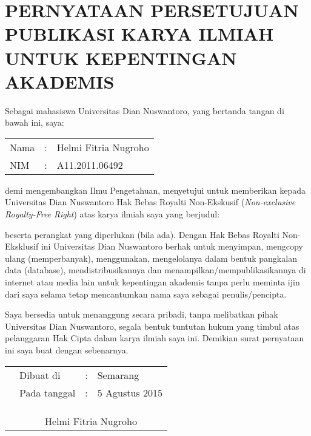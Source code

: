 \documentclass[laporan.tex]{subfiles}
\begin{document}
\chapter*{PERNYATAAN PERSETUJUAN PUBLIKASI KARYA ILMIAH UNTUK KEPENTINGAN AKADEMIS}

Sebagai mahasiswa Universitas Dian Nuswantoro, yang bertanda tangan di bawah ini, saya:

\begin{tabular}{l c l}
Nama & : & Helmi Fitria Nugroho \\
NIM & : & A11.2011.06492 \\
\end{tabular}

demi mengembangkan Ilmu Pengetahuan, menyetujui untuk memberikan kepada Universitas Dian Nuswantoro Hak Bebas Royalti Non-Ekskusif (\emph{Non-exclusive Royalty-Free Right}) atas karya ilmiah saya yang berjudul:


\normalfont
beserta perangkat yang diperlukan (bila ada). Dengan Hak Bebas Royalti Non-Eksklusif ini Universitas Dian Nuswantoro berhak untuk menyimpan, mengcopy ulang (memperbanyak), menggunakan, mengelolanya dalam bentuk pangkalan data (database), mendistribusikannya dan menampilkan/mempublikasikannya di internet atau media lain untuk kepentingan akademis tanpa perlu meminta ijin dari saya selama tetap mencantumkan nama saya sebagai penulis/pencipta.

Saya bersedia untuk menanggung secara pribadi, tanpa melibatkan pihak Universitas Dian Nuswantoro, segala bentuk tuntutan hukum yang timbul atas pelanggaran Hak Cipta dalam karya ilmiah saya ini.
Demikian surat pernyataan ini saya buat dengan sebenarnya.

\begin{tabular}{p{15em} l c l}
& Dibuat di & : & Semarang \\
& Pada tanggal & : & 5 Agustus 2015\\
& & \\
& & \\
& & \\
& \multicolumn{3}{c}{Helmi Fitria Nugroho} \\
\end{tabular}
\end{document}
